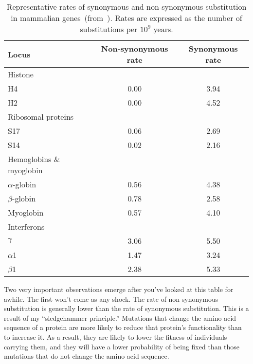 \begin{table}
\begin{center}
\begin{tabular}{lcc}
\hline\hline
Locus     & Non-synonymous rate & Synonymous rate \\
\hline
Histone \\
\quad H4  & 0.00                & 3.94 \\
\quad H2  & 0.00                & 4.52 \\ 
Ribosomal proteins \\
\quad S17 & 0.06                & 2.69 \\
\quad S14 & 0.02                & 2.16 \\
Hemoglobins \& myoglobin \\
\quad $\alpha$-globin & 0.56    & 4.38 \\
\quad $\beta$-globin  & 0.78    & 2.58 \\
\quad Myoglobin       & 0.57    & 4.10 \\
Interferons \\
\quad $\gamma$  & 3.06          & 5.50 \\
\quad $\alpha$1 & 1.47          & 3.24 \\
\quad $\beta$1  & 2.38          & 5.33 \\
\hline
\end{tabular}
\end{center}
\caption{Representative rates of synonymous and non-synonymous
  substitution in mammalian genes~(from~\cite{Li97}). Rates are
  expressed as the number of substitutions per $10^9$
  years.}\label{table:substitution-data}
\end{table}

Two very important observations emerge after you've looked at this
table for awhile. The first won't come as any shock. The rate of
non-synonymous substitution is generally lower than the rate of
synonymous substitution. This is a result of my ``sledgehammer
principle.'' Mutations that change the amino acid sequence of a
protein are more likely to reduce that protein's functionality than to
increase it. As a result, they are likely to lower the fitness of
individuals carrying them, and they will have a lower probability of
being fixed than those mutations that do not change the amino acid
sequence.

